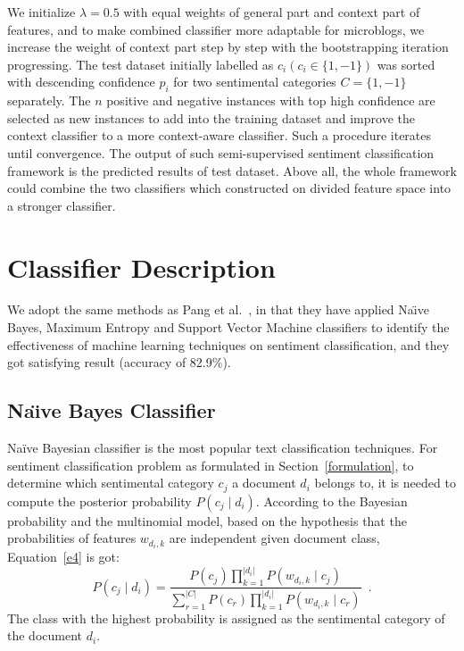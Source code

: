 \documentclass{llncs}
\begin{document}
We initialize $ \lambda = 0.5 $ with equal weights of general part and context part of features, and to make combined classifier more adaptable for microblogs, we  increase the weight of context part step by step with the bootstrapping iteration progressing.
The test dataset initially labelled as $ c_{i} \left( c_{i} \in \lbrace 1, -1\rbrace \right)$ was sorted with descending confidence $ p_{i} $ for two sentimental categories $ C=\lbrace 1,-1\rbrace $ separately.
The $ n $  positive and negative instances with top high confidence are selected as new instances to add into the training dataset and improve the context classifier to a more context-aware classifier. 
Such a procedure iterates until convergence.
The output of such semi-supervised sentiment classification framework is the predicted results of test dataset. 
Above all, the whole framework could combine the two classifiers which constructed on divided feature space into a stronger classifier. 
\section{Classifier Description}
\label{classifier}
We adopt the same methods as Pang et al.~\cite{xsongx:b4}, in that they have applied Na\"\i ve Bayes, Maximum Entropy and Support Vector Machine classifiers to identify the effectiveness of machine learning techniques on sentiment classification, and they got satisfying result (accuracy of 82.9\%).
\subsection{Na\"\i ve Bayes Classifier}
\label{bayes}
Naïve Bayesian classifier is the most popular text classification techniques.
For sentiment classification problem as formulated in Section~\ref{formulation}, to determine which sentimental category $ c_{j} $ a document $ d_{i} $ belongs to, it is needed to compute the posterior probability $ P \left(c_{j} \mid d_{i} \right)$. 
According to the Bayesian probability and the multinomial model, based on the hypothesis that the probabilities of features $ w_{d_{i},k} $ are independent given document class, Equation~\ref{e4} is got:
\begin{equation}
\label{e4}
P \left(c_{j} \mid d_{i} \right) = \frac{P \left( c_{j} \right)\prod_{k=1}^{| d_{i} |} P \left( w_{d_{i},k} \mid c_{j} \right)}{\sum_{r=1}^{|C|}P \left( c_{r} \right)\prod_{k=1}^{| d_{i} |} P \left( w_{d_{i},k} \mid c_{r} \right)} \enspace .
\end{equation}
The class with the highest probability is assigned as the sentimental category of the document $ d_{i} $. 
\end{document}
